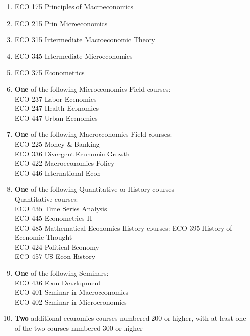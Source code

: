 \documentclass[
  letterpaper,
]{scrbook}
\providecommand{\tightlist}{%
  \setlength{\itemsep}{0pt}\setlength{\parskip}{0pt}}
\begin{document}
\begin{enumerate}
\def\labelenumi{\arabic{enumi}.}
\tightlist
\item
  ECO 175 Principles of Macroeconomics\\
\item
  ECO 215 Prin Microeconomics\\
\item
  ECO 315 Intermediate Macroeconomic Theory\\
\item
  ECO 345 Intermediate Microeconomics\\
\item
  ECO 375 Econometrics\\
\item
  \textbf{One} of the following Microeconomics Field courses:\\
  ECO 237 Labor Economics\\
  ECO 247 Health Economics\\
  ECO 447 Urban Economics\\
\item
  \textbf{One} of the following Macroeconomics Field courses:\\
  ECO 225 Money \& Banking\\
  ECO 336 Divergent Economic Growth\\
  ECO 422 Macroeconomics Policy\\
  ECO 446 International Econ\\
\item
  \textbf{One} of the following Quantitative or History courses:\\
  Quantitative courses:\\
  ECO 435 Time Series Analysis\\
  ECO 445 Econometrics II\\
  ECO 485 Mathematical Economics History courses: ECO 395 History of
  Economic Thought\\
  ECO 424 Political Economy\\
  ECO 457 US Econ History\\
\item
  \textbf{One} of the following Seminars:\\
  ECO 436 Econ Development\\
  ECO 401 Seminar in Macroeconomics\\
  ECO 402 Seminar in Microeconomics\\
\item
  \textbf{Two} additional economics courses numbered 200 or higher, with
  at least one of the two courses numbered 300 or higher
\end{enumerate}
\end{document}
